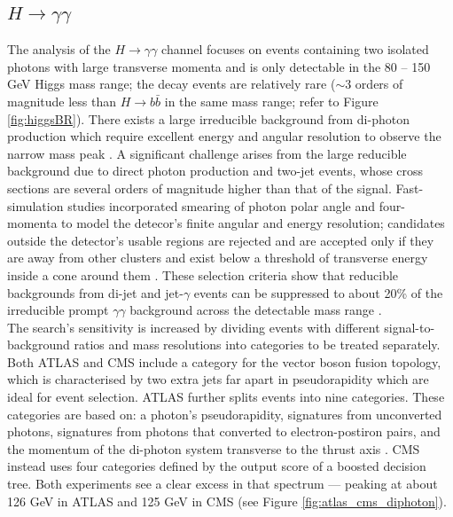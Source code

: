 \documentclass[a4paper,11pt]{article}
\begin{document}
\subsection{$H\rightarrow \gamma \gamma $}
The analysis of the $H \rightarrow \gamma \gamma$ channel focuses on events containing two isolated photons with large transverse momenta and is only detectable in the  80 -- 150 GeV Higgs mass range; the decay events are relatively rare ($\sim 3$ orders of magnitude less than $H \rightarrow b\bar{b}$ in the same mass range; refer to Figure \ref{fig:higgsBR}). There exists a large irreducible background from di-photon production which require excellent energy and angular resolution to observe the narrow mass peak \cite{Buescher:2005re}. A significant challenge arises from the large reducible background due to direct photon production and two-jet events, whose cross sections are several orders of magnitude higher than that of the signal. Fast-simulation studies incorporated smearing of photon polar angle and four-momenta to model the detecor's finite angular and energy resolution; candidates outside the detector’s usable regions are rejected and are accepted only if they are away from other clusters and exist below a threshold of transverse energy inside a cone around them \cite{ATLAS:1999uwa}. These selection criteria show that reducible backgrounds from di-jet and jet-$\gamma$ events can be suppressed to about 20\% of the irreducible prompt $\gamma \gamma$ background across the detectable mass range \cite{Buescher:2005re}.\\

The search's sensitivity is increased by dividing events with different signal-to-background ratios and mass resolutions into categories to be treated separately. Both ATLAS and CMS include a category for the vector boson fusion topology, which is characterised by two extra jets far apart in pseudorapidity which are ideal for event selection. ATLAS further splits events into nine categories. These categories are based on: a photon's pseudorapidity, signatures from unconverted photons, signatures from photons that converted to electron-postiron pairs, and the momentum of the di-photon system transverse to the thrust axis \cite{Dittmaier:2012nh}. CMS instead uses four categories defined by the output score of a boosted decision tree. Both experiments see a clear excess in that spectrum — peaking at about 126 GeV in ATLAS and 125 GeV in CMS (see Figure \ref{fig:atlas_cms_diphoton}).
\end{document}
